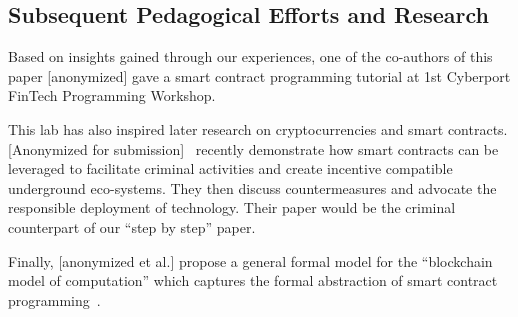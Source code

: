 \documentclass{llncs}
\newcommand{\ignore}[1]{}
\begin{document}
\subsection{Subsequent Pedagogical Efforts and Research}
Based on insights gained through our experiences, 
one of the co-authors of this paper [anonymized] 
gave a smart contract programming 
tutorial 
at 1st Cyberport FinTech Programming Workshop. 


This lab has also inspired later research 
on cryptocurrencies and smart contracts.
[Anonymized for submission]~\cite{crime} recently 
demonstrate how smart contracts can be leveraged to facilitate 
criminal activities 
and create incentive compatible underground eco-systems.
They then discuss countermeasures and advocate the responsible deployment
of technology. 
Their paper would be the criminal counterpart  
of our ``step by step'' paper.

Finally, [anonymized et al.]
propose a general formal model for the ``blockchain  
model of computation'' which captures the formal abstraction
of smart contract programming~\cite{hawk}.





\ignore{
Our lab exposed numerous pitfalls of programming  
in the smart contract model of execution.
This inspired our ongoing research 
where we design new programming languages that facilitate
non-specialist programmers 
to develop safe cryptocurrency contracts~\cite{hawk}.
In particular, our new programming languages will aim to 
1) remove the burden of implementing and optimizing cryptography
from  the programmer;
and 
2) offer tools to formally reason about the safety of contracts. 
}






\end{document}
